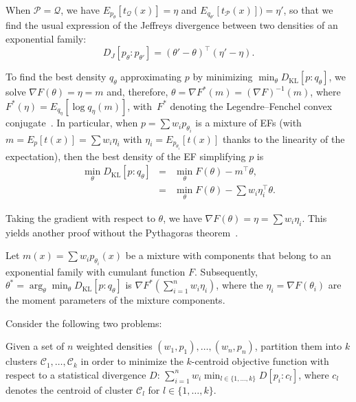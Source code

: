\documentclass[entropy,article,accept,oneauthor,pdftex,entropy]{Definitions/mdpi}
\def\calQ{\mathcal{Q}}
\def\KL{\mathrm{KL}}
\def\calQ{\mathcal{Q}}
\def\calC{\mathcal{C}}
\def\calP{\mathcal{P}}
\begin{document}
\begin{paracol}{2}
\switchcolumn

When $\calP=\calQ$, we have $E_{p_\theta}[t_\calQ(x)]=\eta$ and $E_{q_{\theta'}}[t_\calP(x)])=\eta'$, so that we find the usual expression
of the Jeffreys divergence between two densities of an exponential family:
\begin{equation}
D_J[p_\theta:p_{\theta'}]=(\theta'-\theta)^\top (\eta'-\eta).
\end{equation}



To find the best density $q_\theta$ approximating $p$ by minimizing $\min_{\theta} D_\KL[p:q_\theta]$, we solve $\nabla F(\theta)=\eta=m$ and, therefore,
$\theta=\nabla F^*(m)=(\nabla F)^{-1}(m)$, where $F^*(\eta)=E_{q_\eta}[\log q_\eta(m)]$, with~$F^*$ denoting the Legendre--Fenchel convex conjugate~\cite{EF-2014}.
In particular, when $p=\sum w_i p_{\theta_i}$ is a mixture of EFs (with $m=E_p[t(x)]=\sum w_i\eta_i$ with $\eta_i=E_{p_{\theta_i}}[t(x)]$ thanks to the linearity of the expectation), then the best density of the EF simplifying $p$ is
\begin{eqnarray}
\min_\theta D_\KL[p:q_\theta] &=& \min_\theta F(\theta)-m^\top\theta,\\
&=& \min_\theta F(\theta)-\sum w_i\eta_i^\top\theta.
\end{eqnarray}

Taking the gradient with respect to $\theta$, we have $\nabla F(\theta)=\eta=\sum w_i\eta_i$.
This yields another proof without the Pythagoras theorem~\cite{Pelletier-2005,LearningMixtureKde-2013}.

\begin{Proposition}\label{prop:mixsinglecomponent}
Let $m(x)=\sum w_i p_{\theta_i}(x)$ be a mixture with components that belong to an exponential family with cumulant function $F$.
Subsequently, $\theta^*=\arg_\theta \min_{\theta} D_\KL[p:q_\theta]$ is $\nabla F^*(\sum_{i=1}^n w_i\eta_i)$, where the $\eta_i=\nabla F(\theta_i)$ are the moment parameters of the mixture components.
\end{Proposition}


Consider the following two problems:

\begin{Problem}\label{pb:dc}
Given a set of $n$ weighted densities $(w_1,p_1), \ldots, (w_n,p_n)$, partition them into $k$ clusters $\calC_1,\ldots,\calC_k$ in order to minimize the $k$-centroid objective function with respect to a statistical divergence $D$:
$\sum_{i=1}^n w_i \min_{l\in\{1,\ldots,k\}}  D[p_i:c_l]$, where $c_l$ denotes the centroid of cluster $\calC_l$ for $l\in\{1,\ldots,k\}$.
\end{Problem}


\end{paracol}
\end{document}

